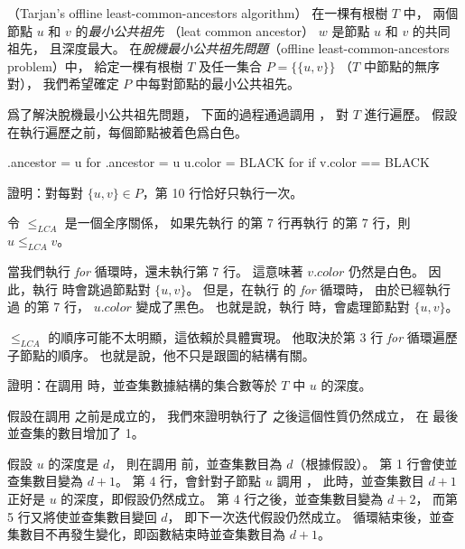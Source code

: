 \startPROBLEM
（Tarjan’s offline least-common-ancestors algorithm）
在一棵有根樹 $T$ 中，
兩個節點 $u$ 和 $v$ 的\emph{最小公共祖先}
（leat common ancestor） $w$ 是節點 $u$ 和 $v$ 的共同祖先，
且深度最大。
在\emph{脫機最小公共祖先問題}（offline least-common-ancestors problem）中，
給定一棵有根樹 $T$ 及任一集合 $P=\{\{u,v\}\}$ （$T$ 中節點的無序對），
我們希望確定 $P$ 中每對節點的最小公共祖先。

爲了解決脫機最小公共祖先問題，
下面的過程通過調用 ，
對 $T$ 進行遍歷。
假設在執行遍歷之前，每個節點被着色爲白色。

\startCLRSCODE
{}
.ancestor = u
for 
	.ancestor = u
u.color = BLACK
for 
	if v.color == BLACK
\stopCLRSCODE

\startigBase[a]\startitem
證明：對每對 $\{u,v\}\in P$，第 10 行恰好只執行一次。
\stopitem\stopigBase

\startANSWER
令 $\le_{LCA}$ 是一個全序關係，
如果先執行  的第 7 行再執行  的第 7 行，則 $u \le_{LCA} v$。

當我們執行 \emph{for} 循環時，還未執行第 7 行。
這意味著 $v.color$ 仍然是白色。
因此，執行  時會跳過節點對 $\{u, v\}$。
但是，在執行  的 \emph{for} 循環時，
由於已經執行過  的第 7 行，
 $u.color$ 變成了黑色。
也就是說，執行  時，會處理節點對 $\{u, v\}$。

$\le_{LCA}$ 的順序可能不太明顯，這依賴於具體實現。
他取決於第 3 行 \emph{for} 循環遍歷子節點的順序。
也就是說，他不只是跟圖的結構有關。
\stopANSWER

\startigBase[continue]\startitem
證明：在調用  時，並查集數據結構的集合數等於 $T$ 中 $u$ 的深度。
\stopitem\stopigBase

\startANSWER
假設在調用  之前是成立的，
我們來證明執行了  之後這個性質仍然成立，
在  最後並查集的數目增加了 1。

假設 $u$ 的深度是 $d$，
則在調用  前，並查集數目為 $d$（根據假設）。
第 1 行會使並查集數目變為 $d+1$。
第 4 行，會針對子節點 $u$ 調用 ，
此時，並查集數目 $d+1$ 正好是 $u$ 的深度，即假設仍然成立。
第 4 行之後，並查集數目變為 $d+2$，
而第 5 行又將使並查集數目變回 $d$，
即下一次迭代假設仍然成立。
循環結束後，並查集數目不再發生變化，即函數結束時並查集數目為 $d+1$。
\stopANSWER

